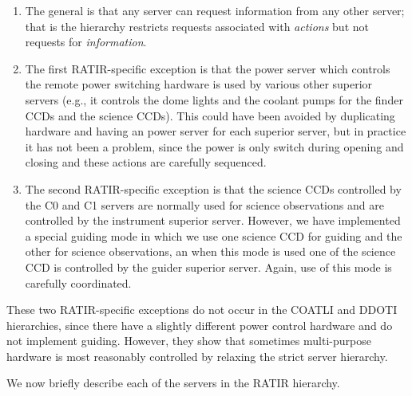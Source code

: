 \documentclass{article}
\newcommand{\server}[1]{{\ttfamily #1}}
\begin{document}
\begin{enumerate}
\item
The general is that any server can request information from any other server; that is the hierarchy restricts requests associated with \emph{actions} but not requests for \emph{information}.
\item
The first RATIR-specific exception is that the \server{power} server which controls the remote power switching hardware is used by various other superior servers (e.g., it controls the dome lights and the coolant pumps for the finder CCDs and the science CCDs). This could have been avoided by duplicating hardware and having an \server{power} server for each superior server, but in practice it has not been a problem, since the power is only switch during opening and closing and these actions are carefully sequenced.
\item
The second RATIR-specific exception is that the science CCDs controlled by the \server{C0} and \server{C1} servers are normally used for science observations and are controlled by the \server{instrument} superior server. However, we have implemented a special guiding mode in which we use one science CCD for guiding and the other for science observations, an when this mode is used one of the science CCD is controlled by the \server{guider} superior server. Again, use of this mode is carefully coordinated.
\end{enumerate}

These two RATIR-specific exceptions do not occur in the COATLI and DDOTI hierarchies, since there have a slightly different power control hardware and do not implement guiding. However, they show that sometimes multi-purpose hardware is most reasonably controlled by relaxing the strict server hierarchy.

We now briefly describe each of the servers in the RATIR hierarchy.
\end{document}
